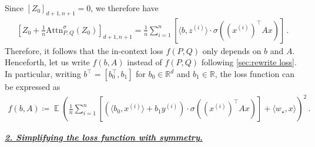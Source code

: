 \documentclass{article}
\DeclareMathOperator{\E}{\mathbb{E}}
\newcommand{\R}{\mathbb{R}}
\newcommand{\atth}{\mathrm{Attn}^\sigma}
\newcommand{\relu}{\sigma}
\newcommand{\bb}{A}
\newcommand{\cc}{b}
\newcommand{\wstar}{w_\star}
\newcommand{\tz}[1]{{z^{(#1)}}}
\newcommand{\tx}[1]{x^{(#1)}}
\newcommand{\ty}[1]{y^{(#1)}}
\newcommand{\emphh}[1]{\textbf{\emph{#1}}}
\newcommand{\inpp}[2]{ \langle #1,#2\rangle}
\begin{document}
Since $[Z_0]_{d+1,n+1}=0$, we therefore have 
\begin{align}
    \left[Z_{0} +\frac{1}{n} \atth_{P,Q}(Z_0) \right]_{d+1,n+1} = \frac{1}{n}\sum_{i=1}^n \left[ \inpp{\cc}{\tz{i}}\cdot \relu((\tx{i})^\top \bb x ) \right]\,.
\end{align}
Therefore, it follows that the in-context loss $f(P,Q)$ only depends on $\cc$ and $\bb$.
Henceforth, let us write $f(\cc,\bb)$ instead of $f(P,Q)$ following \autoref{sec:rewrite loss}. 
In particular, writing $\cc^\top = [\cc_0^\top ,\cc_1]$ for $\cc_0\in \R^d$ and $\cc_1\in \R$, the loss function can be expressed as 
\begin{align} \label{exp:nonlinear_loss}
    f(\cc,\bb) \coloneqq \E \left( \frac{1}{n}\sum_{i=1}^n \left[(\inpp{\cc_0}{\tx{i}}+ \cc_1 \ty{i})\cdot \relu((\tx{i})^\top \bb x ) \right] + \inpp{\wstar}{x}  \right)^2\,.
\end{align}

 \underline{\emphh{2. Simplifying the loss function with symmetry.}}
\end{document}
